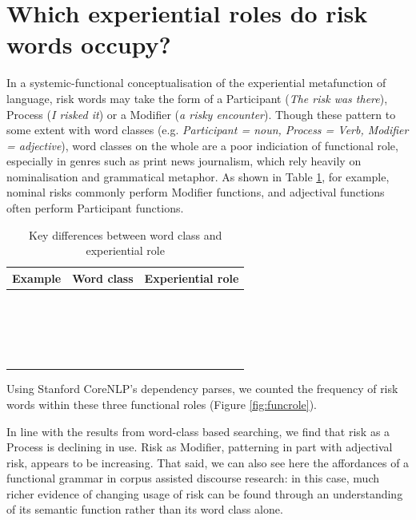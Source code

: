 	\section{Which experiential roles do risk words occupy?} 
	\FloatBarrier

    In a systemic-functional conceptualisation of the experiential metafunction of language, risk words may take the form of a Participant (\emph{The risk was there}), Process (\emph{I risked it}) or a Modifier (\emph{a risky encounter}). Though these pattern to some extent with word classes (e.g. \emph{Participant = noun, Process = Verb, Modifier = adjective}), word classes on the whole are a poor indiciation of functional role, especially in genres such as print news journalism, which rely heavily on nominalisation and grammatical metaphor. As shown in Table \ref{tab:class_and_role}, for example, nominal risks commonly perform Modifier functions, and adjectival functions often perform Participant functions.

            \begin{table}
            \small
            \centering
            \begin{tabular}{|l|l|l|}
            \hline
            \textbf{Example}       & \textbf{Word class}     & \textbf{Experiential role}     \\ \hline
            ~  &  &     \\ \hline
            ~  &  &     \\ \hline
            ~  &  &     \\ \hline
            ~  &  &     \\ \hline
            \end{tabular}
            \caption{Key differences between word class and experiential role}
            \label{tab:class_and_role}
            \end{table}

    Using Stanford CoreNLP's dependency parses, we counted the frequency of risk words within these three functional roles (Figure \ref{fig:funcrole}). 

    In line with the results from word-class based searching, we find that risk as a Process is declining in use. Risk as Modifier, patterning in part with adjectival risk, appears to be increasing. That said, we can also see here the affordances of a functional grammar in corpus assisted discourse research: in this case, much richer evidence of changing usage of risk can be found through an understanding of its semantic function rather than its word class alone.

